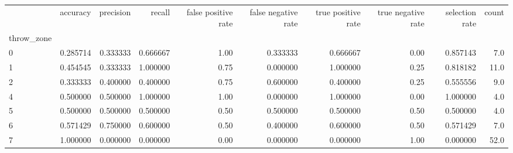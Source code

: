 \begin{tabular}{lrrrrrrrrr}
\toprule
{} &  accuracy &  precision &    recall &  false positive rate &  false negative rate &  true positive rate &  true negative rate &  selection rate &  count \\
throw\_zone &           &            &           &                      &                      &                     &                     &                 &        \\
\midrule
0          &  0.285714 &   0.333333 &  0.666667 &                 1.00 &             0.333333 &            0.666667 &                0.00 &        0.857143 &    7.0 \\
1          &  0.454545 &   0.333333 &  1.000000 &                 0.75 &             0.000000 &            1.000000 &                0.25 &        0.818182 &   11.0 \\
2          &  0.333333 &   0.400000 &  0.400000 &                 0.75 &             0.600000 &            0.400000 &                0.25 &        0.555556 &    9.0 \\
4          &  0.500000 &   0.500000 &  1.000000 &                 1.00 &             0.000000 &            1.000000 &                0.00 &        1.000000 &    4.0 \\
5          &  0.500000 &   0.500000 &  0.500000 &                 0.50 &             0.500000 &            0.500000 &                0.50 &        0.500000 &    4.0 \\
6          &  0.571429 &   0.750000 &  0.600000 &                 0.50 &             0.400000 &            0.600000 &                0.50 &        0.571429 &    7.0 \\
7          &  1.000000 &   0.000000 &  0.000000 &                 0.00 &             0.000000 &            0.000000 &                1.00 &        0.000000 &   52.0 \\
\bottomrule
\end{tabular}
